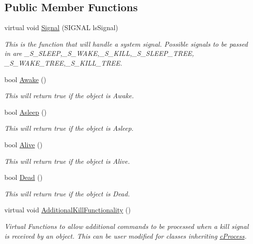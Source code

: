 \subsection*{Public Member Functions}
\begin{DoxyCompactItemize}
\item 
virtual void \hyperlink{classc_signal_a77af8271fc7ffb8696ba73a01e213808}{Signal} (SIGNAL lsSignal)
\begin{DoxyCompactList}\small\item\em This is the function that will handle a system signal. Possible signals to be passed in are \_\-S\_\-SLEEP,\_\-S\_\-WAKE,\_\-S\_\-KILL,\_\-S\_\-SLEEP\_\-TREE, \_\-S\_\-WAKE\_\-TREE,\_\-S\_\-KILL\_\-TREE. \item\end{DoxyCompactList}\item 
bool \hyperlink{classc_signal_a64e6fb4aee9b3a6bee5b56c7b86294cd}{Awake} ()
\begin{DoxyCompactList}\small\item\em This will return true if the object is Awake. \item\end{DoxyCompactList}\item 
bool \hyperlink{classc_signal_a90286da3e933e6fe2560fd0dfec777b2}{Asleep} ()
\begin{DoxyCompactList}\small\item\em This will return true if the object is Asleep. \item\end{DoxyCompactList}\item 
bool \hyperlink{classc_signal_aff5636e7aacacc05512c121610e3ec5e}{Alive} ()
\begin{DoxyCompactList}\small\item\em This will return true if the object is Alive. \item\end{DoxyCompactList}\item 
bool \hyperlink{classc_signal_a85f403bacc2e87bb16f4282bd145484b}{Dead} ()
\begin{DoxyCompactList}\small\item\em This will return true if the object is Dead. \item\end{DoxyCompactList}\item 
virtual void \hyperlink{classc_signal_a3770218c9b8481600e0ab180d90029c5}{AdditionalKillFunctionality} ()
\begin{DoxyCompactList}\small\item\em Virtual Functions to allow additional commands to be processed when a kill signal is received by an object. This can be user modified for classes inheriting \hyperlink{classc_process}{cProcess}. \item\end{DoxyCompactList}\item 

\end{DoxyCompactItemize}
